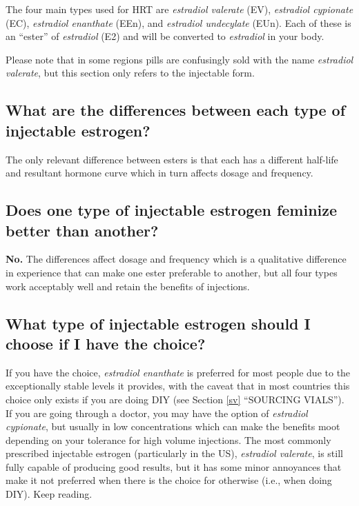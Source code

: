 \documentclass{article}
\begin{document}
The four main types used for HRT are \textit{estradiol valerate} (EV), \textit{estradiol cypionate} (EC), \textit{estradiol enanthate} (EEn), and \textit{estradiol undecylate} (EUn). Each of these is an “ester” of \textit{estradiol} (E2) and will be converted to \textit{estradiol} in your body.

Please note that in some regions pills are confusingly sold with the name \textit{estradiol valerate}, but this section only refers to the injectable form.

\subsection{What are the differences between each type of injectable estrogen?}

The only relevant difference between esters is that each has a different half-life and resultant hormone curve which in turn affects dosage and frequency.

\subsection{Does one type of injectable estrogen feminize better than another?}

\textbf{No.} The differences affect dosage and frequency which is a qualitative difference in experience that can make one ester preferable to another, but all four types work acceptably well and retain the benefits of injections.

\subsection{What type of injectable estrogen should I choose if I have the choice?}

If you have the choice, \textit{estradiol enanthate} is preferred for most people due to the exceptionally stable levels it provides, with the caveat that in most countries this choice only exists if you are doing DIY (see Section \ref{sv} “SOURCING VIALS”). If you are going through a doctor, you may have the option of \textit{estradiol cypionate}, but usually in low concentrations which can make the benefits moot depending on your tolerance for high volume injections. The most commonly prescribed injectable estrogen (particularly in the US), \textit{estradiol valerate}, is still fully capable of producing good results, but it has some minor annoyances that make it not preferred when there is the choice for otherwise (i.e., when doing DIY). Keep reading.
\end{document}
